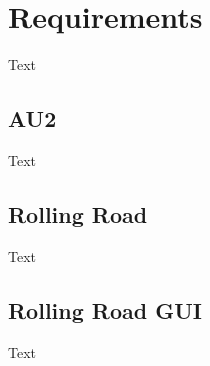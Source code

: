 \chapter{Requirements}
Text

\section{AU2}
Text

\section{Rolling Road}
Text

\section{Rolling Road GUI}
Text